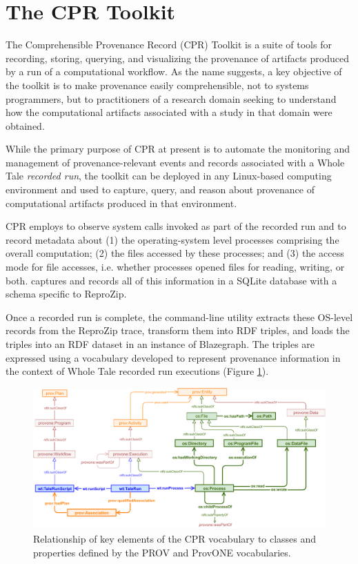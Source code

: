 \section{The CPR Toolkit}

The Comprehensible Provenance Record (CPR) Toolkit is a suite of tools for recording, storing, querying, and visualizing the provenance of artifacts produced by a run of a computational workflow. As the name suggests, a key objective of the toolkit is to make provenance easily comprehensible, not to systems programmers, but to practitioners of a research domain seeking to understand how the computational artifacts associated with a study in that domain were obtained.

While the primary purpose of CPR at present is to automate the monitoring and management of provenance-relevant events and records associated with a Whole Tale \emph{recorded run}, the toolkit can be deployed in any Linux-based computing environment and used to capture, query, and reason about provenance of computational artifacts produced in that environment.

CPR employs  \cite{rampin_reprozip_2016} to observe system calls invoked as part of the recorded run and to record metadata about (1) the operating-system level processes comprising the overall computation; (2) the files accessed by these processes; and (3) the access mode for file accesses, i.e. whether processes opened files for reading, writing, or both.  captures and records all of this information in a SQLite database with a schema specific to ReproZip.

Once a recorded run is complete, the  command-line utility extracts these OS-level records from the ReproZip trace, transform them into RDF triples, and loads the triples into an RDF dataset in an instance of Blazegraph. The triples are expressed using a vocabulary developed to represent provenance information in the context of Whole Tale recorded run executions (Figure \ref{fig:cpr-vocab}). 

\begin{figure}[h]
    \includegraphics[width=\linewidth]{figures/cpr-vocab.pdf}
    \caption{Relationship of key elements of the CPR vocabulary to classes and properties defined by the PROV and ProvONE vocabularies.}
    \label{fig:cpr-vocab}
\end{figure}

